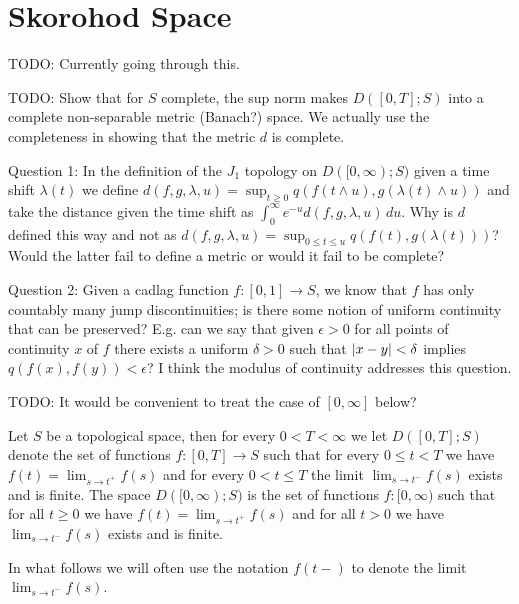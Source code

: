 \chapter{Skorohod Space}
TODO: Currently going through this.  

TODO: Show that for $S$ complete, the sup norm makes $D([0,T];S)$ into a complete non-separable metric (Banach?) space.
We actually use the completeness in showing that the metric $d$ is complete.

Question 1:  In the definition of the $J_1$ topology on $D([0,\infty);
S)$ given a time shift $\lambda(t)$ we define $d(f,g,\lambda, u) = \sup_{t \geq 0} q(f(t \wedge u),
g(\lambda(t) \wedge u))$ and take the distance given the time shift as
$\int_0^\infty e^{-u} d(f,g,\lambda,u) \, du$.  Why is $d$ defined
this way and not as  $d(f,g,\lambda, u) = \sup_{0 \leq t \leq u} q(f(t),
g(\lambda(t)))$?  Would the latter fail to define a metric or would it
fail to be complete?

Question 2: Given a cadlag function $f : [0,1] \to S$, we know that
$f$ has only countably many jump discontinuities; is there some notion
of uniform continuity that can be preserved?  E.g. can we say that
given $\epsilon > 0$ for
all points of continuity $x$ of $f$  there exists a uniform $\delta > 0$
such that $\left \vert x-y \right \vert < \delta$ implies $q(f(x), f(y)) < \epsilon$?  I think the
modulus of continuity addresses this question.

TODO: It would be convenient to treat the case of $[0,\infty]$ below?

\begin{defn}Let $S$ be a topological space, then for every $0 < T < \infty$ we let $D([0,T]; S)$ denote the set of functions
$f : [0,T] \to S$ such that for every $0 \leq t < T$ we have $f(t) = \lim_{s \to t^+} f(s)$ and for every $0 < t \leq T$ the limit 
$\lim_{s \to t^{-}} f(s)$ exists and is finite.  The space $D([0,\infty); S)$ is the set of functions $f : [0,\infty)$ such that for all 
$t \geq 0$ we have $f(t) = \lim_{s \to t^+} f(s)$ and for all $t >0$ we have $\lim_{s \to t^{-}} f(s)$ exists and is finite.
\end{defn}

In what follows we will often use the notation $f(t-)$ to denote the limit $\lim_{s \to t^{-}} f(s)$.

